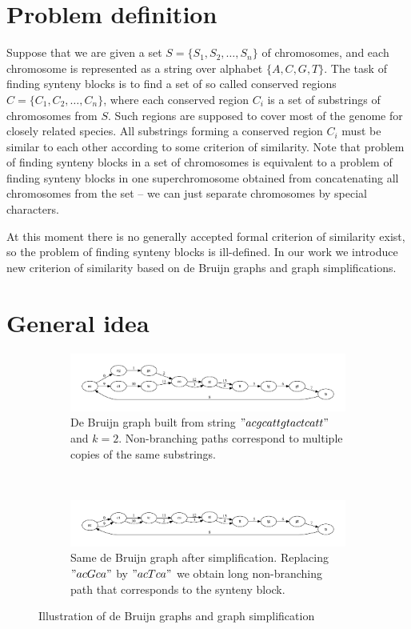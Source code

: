 \documentclass[a4paper,12pt]{scrartcl}
\begin{document}
\section{Problem definition}

Suppose that we are given a set \(S = \lbrace S_{1}, S_{2}, \ldots, S_{n} \rbrace \) of chromosomes, and each
chromosome is represented as a string over alphabet \(\lbrace A, C, G, T \rbrace \). The task of finding synteny
blocks is to find a set of so called conserved regions \(C = \lbrace C_{1}, C_{2}, \ldots , C_{n} \rbrace \), where
each conserved region \(C_{i}\) is a set of substrings of chromosomes from \(S\). Such regions are supposed 
to cover most of the genome for closely related species.  All substrings forming a conserved region \(C_{i}\) must be
similar to each other according to some criterion of similarity. Note that problem of finding synteny blocks in a set
of chromosomes is equivalent to a problem of finding synteny blocks in one superchromosome
obtained from concatenating all chromosomes from the set -- we can just separate chromosomes by special characters.

At this moment there is no generally accepted formal criterion of similarity exist, so the problem of finding synteny blocks is ill-defined.
In our work we introduce new criterion of similarity based on de Bruijn graphs and graph simplifications.

\section{General idea}

\begin{figure}
        \begin{subfigure}[a]{1\textwidth}
		\includegraphics[scale = 0.50]{graph1.pdf}
		\small \caption{De Bruijn graph built from string \("acgcattgtactcatt"\) and \(k = 2\). Non-branching paths correspond to multiple
			copies of the same substrings.}
		\label{DeBruijnA}
        \end{subfigure}
	\\
        \begin{subfigure}[b]{1\textwidth}
		\includegraphics[scale = 0.50]{graph2.pdf}
		\small \caption{Same de Bruijn graph after simplification. Replacing \("acGca"\) by \("acTca"\) we obtain long non-branching path
			that corresponds to the synteny block.}
		\label{DeBruijnB}
        \end{subfigure}
	\small \caption{Illustration of de Bruijn graphs and graph simplification}
\end{figure}
\end{document}
